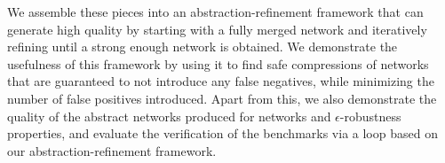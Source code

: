 We assemble these pieces into an abstraction-refinement framework that can
generate high quality \abs by starting with a fully merged network and
iteratively refining until a strong enough network is obtained. We demonstrate
the usefulness of this framework by using it to find safe compressions of
\mnist networks that are guaranteed to not introduce any false negatives, while
minimizing the number of false positives introduced. Apart from this, we also
demonstrate the quality of the abstract networks produced for \mnist networks
and $\epsilon$-robustness properties, and evaluate the verification of the
\acasxu benchmarks via a \cegar loop based on our abstraction-refinement
framework.


